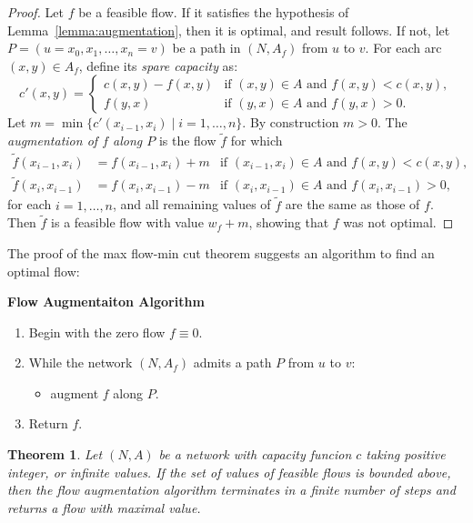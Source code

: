 \documentclass{amsbook}
\newtheorem{theorem}{Theorem}[section]
\theoremstyle{definition}
\theoremstyle{remark}
\begin{document}
\begin{proof}
  Let $f$ be a feasible flow.
  If it satisfies the hypothesis of Lemma~\ref{lemma:augmentation}, then it is optimal, and result follows.
  If not, let $P=(u=x_0,x_1,\dotsc,x_n=v)$ be a path in $(N,A_f)$ from $u$ to $v$.
  For each arc $(x,y)\in A_f$, define its \emph{spare capacity} as:
  \begin{displaymath}
    c'(x,y) =
    \begin{cases}
      c(x,y)-f(x,y) &\text{if } (x,y)\in A \text{ and } f(x,y)<c(x,y),\\
      f(y,x) &\text{if } (y,x)\in A \text{ and } f(y,x)>0.
    \end{cases}
  \end{displaymath}
  Let $m=\min\{c'(x_{i-1},x_i)\mid i=1,\dotsc,n\}$.
  By construction $m>0$.
  The \emph{augmentation of $f$ along $P$} is the flow $\tilde f$ for which
  \begin{align*}
    \tilde f(x_{i-1},x_i) & = f(x_{i-1},x_i) + m &\text{if $(x_{i-1},x_i)\in A$ and $f(x,y)<c(x,y)$},\\
    \tilde f(x_i,x_{i-1}) & = f(x_i,x_{i-1}) - m & \text{if $(x_i,x_{i-1})\in A$ and $f(x_i,x_{i-1})>0$},
  \end{align*}
  for each $i=1,\dotsc,n$, and all remaining values of $\tilde f$ are the same as those of $f$.
  Then $\tilde f$ is a feasible flow with value $w_f+m$, showing that $f$ was not optimal.
\end{proof}
The proof of the max flow-min cut theorem suggests an algorithm to find an optimal flow:
\begin{center}
  \textbf{Flow Augmentaiton Algorithm}
\end{center}
\begin{enumerate}
\item Begin with the zero flow $f\equiv 0$.
\item While the network $(N,A_f)$ admits a path $P$ from $u$ to $v$:
  \begin{itemize}
  \item   augment $f$ along $P$.
  \end{itemize}
\item Return $f$.
\end{enumerate}
\begin{theorem}
  Let $(N,A)$ be a network with capacity funcion $c$ taking positive integer, or infinite values.
  If the set of values of feasible flows is bounded above, then the flow augmentation algorithm terminates in a finite number of steps and returns a flow with maximal value.
\end{theorem}
\end{document}
